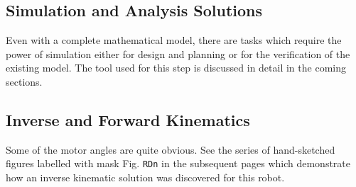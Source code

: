 {    \subsection{Simulation and Analysis Solutions}
    {
        Even with a complete mathematical model, there are tasks which require the power of simulation either for design and planning or for the verification of the existing model. The tool used for this step is discussed in detail in the coming sections.
    }
}

    \subsection{Inverse and Forward Kinematics}
    Some of the motor angles are quite obvious. See the series of hand-sketched figures labelled with mask Fig. \texttt{RDn} in the subsequent pages which demonstrate how an inverse kinematic solution was discovered for this robot.

